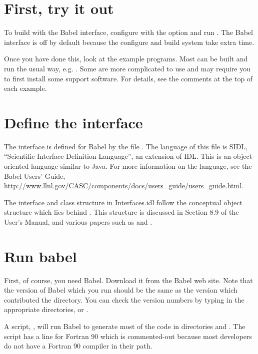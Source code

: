 \section{First, try it out}

To build \hypre{} with the Babel interface, configure with the
 option and run .  The Babel interface
is off by default because the configure and build system take extra
time.

Once you have done this, look at the example programs.  Most can be
built and run the usual way, e.g. .  Some are
more complicated to use and may require you to first install some
support software.  For details, see the comments at the top of each
example.

\section{Define the \hypre{} interface}

The \hypre{} interface is defined for Babel by the file
.  The language of this file is SIDL, ``Scientific
Interface Definition Language'', an extension of IDL.  This is an
object-oriented language similar to Java.  For more information on the
language, see the Babel Users' Guide,
\url{http://www.llnl.gov/CASC/components/docs/users_guide/users_guide.html}.

The interface and class structure in Interfaces.idl follow the
conceptual object structure which lies behind \hypre{}.  This
structure is discussed in Section 8.9 of the \hypre{} User's Manual,
and various papers such as \cite{EChow_AJCleary_RDFalgout_1998} and
\cite{RDFalgout_JEJones_UMYang_2005a}.

\section{Run babel}

First, of course, you need Babel.  Download it from the Babel web
site.  Note that the version of Babel which you run should be the same
as the version which contributed the  directory.
You can check the version numbers by typing 
in the appropriate directories, or .

A script, , will run Babel to generate most of the
code in directories  and
.  The script has a line for Fortran 90
which is commented-out because most \hypre{} developers do not have a
Fortran 90 compiler in their path.

